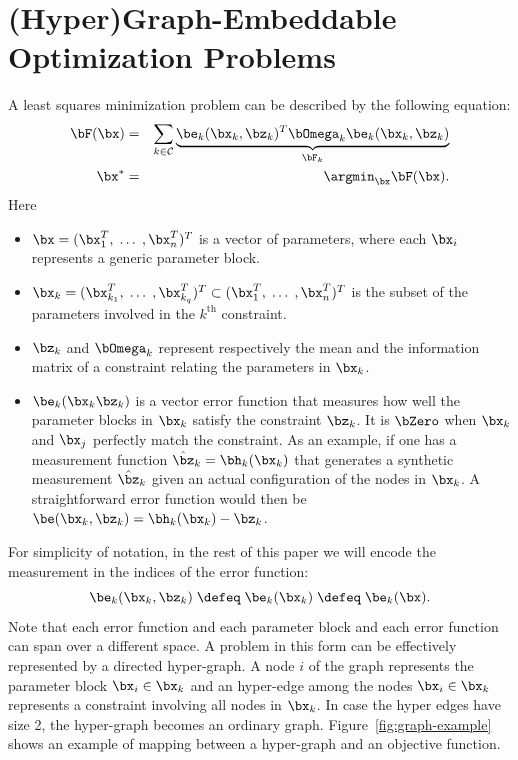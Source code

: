 \documentclass[a4paper]{article}
\begin{document}
\section{(Hyper)Graph-Embeddable Optimization Problems}
A least squares minimization problem can be described by the following equation:
\begin{eqnarray}
\bF(\bx)&=& \sum_{k \in\mathcal{C}}
\underbrace{\be_k(\bx_k, \bz_{k})^T \bOmega_{k} \be_k(\bx_k, \bz_{k})}_{\bF_{k}}
\label{eq:sumOfFactors}\\
\bx^*&=&\argmin_{\bx} \bF(\bx).
\label{eq:toMinimize}
\end{eqnarray}
Here
\begin{itemize}
  \item  $\bx=(\bx_1^T,\;\ldots\;,\bx_n^T)^T$ is a vector of
    parameters, where each $\bx_i$ represents a generic parameter block.
  \item $\bx_k=(\bx_{k_1}^T,\;\ldots\;,\bx_{k_q}^T)^T \subset
    (\bx_1^T,\;\ldots\;,\bx_n^T)^T$ is the subset of the parameters
    involved in the $k^\mathrm{th}$ constraint.  
  \item $\bz_{k}$ and $\bOmega_{k}$ represent 
    respectively the mean and the information matrix of a constraint
    relating the parameters in $\bx_k$.
  \item $\be_k(\bx_k \bz_{k})$ is a vector error function
    that measures how well the parameter blocks in $\bx_k$ satisfy the
    constraint $\bz_{k}$. It is $\bZero$ when $\bx_k$ and $\bx_j$
    perfectly match the constraint.  As an example, if one has a
    measurement function $\hat \bz_k = \bh_k(\bx_k)$ that generates a
    synthetic measurement $\hat \bz_k$ given an actual configuration
    of the nodes in $\bx_k$.  A straightforward error function would
    then be $\be(\bx_k, \bz_{k}) = \bh_k(\bx_k) - \bz_k$.
\end{itemize}
For simplicity of notation, in the rest of this paper we will encode
the measurement in the indices of the error function:
\begin{equation}
\be_k(\bx_k, \bz_{k}) \; \defeq \; \be_{k}(\bx_k) \; \defeq \; \be_{k}(\bx).
\end{equation}
Note that each error function and each parameter block and each error
function can span over a different space.  A problem in this form can
be effectively represented by a directed hyper-graph. A node $i$ of
the graph represents the parameter block $\bx_i \in \bx_k$ and an
hyper-edge among the nodes $\bx_{i} \in \bx_k $ represents a
constraint involving all nodes in $\bx_k$. In case the hyper edges
have size 2, the hyper-graph becomes an ordinary graph.
Figure~\ref{fig:graph-example} shows an
example of mapping between a hyper-graph and an objective function.
\end{document}
